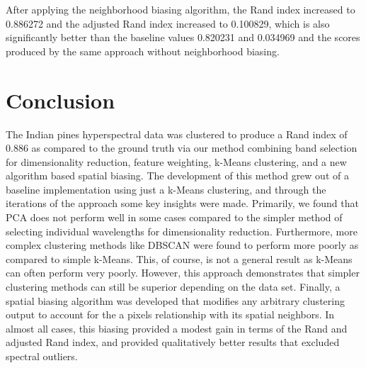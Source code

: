 \documentclass[journal]{IEEEtran}
\begin{document}
  After applying the neighborhood biasing algorithm, the Rand index increased to 0.886272 and the adjusted Rand index increased to 0.100829, which is also significantly better than the baseline values 0.820231 and 0.034969 and the scores produced by the same approach without neighborhood biasing.\\


\section{Conclusion}
  The Indian pines hyperspectral data was clustered to produce a Rand index of 0.886 as compared to the ground truth via our method combining band selection for dimensionality reduction, feature weighting, k-Means clustering, and a new algorithm based spatial biasing. The development of this method grew out of a baseline implementation using just a k-Means clustering, and through the iterations of the approach some key insights were made. Primarily, we found that PCA does not perform well in some cases compared to the simpler method of selecting individual wavelengths for dimensionality reduction. Furthermore, more complex clustering methods like DBSCAN were found to perform more poorly as compared to simple k-Means. This, of course, is not a general result as k-Means can often perform very poorly. However, this approach demonstrates that simpler clustering methods can still be superior depending on the data set. Finally, a spatial biasing algorithm was developed that modifies any arbitrary clustering output to account for the a pixels relationship with its spatial neighbors. In almost all cases, this biasing provided a modest gain in terms of the Rand and adjusted Rand index, and provided qualitatively better results that excluded spectral outliers.\\


\ifCLASSOPTIONcaptionsoff
  \newpage
\fi
\end{document}
